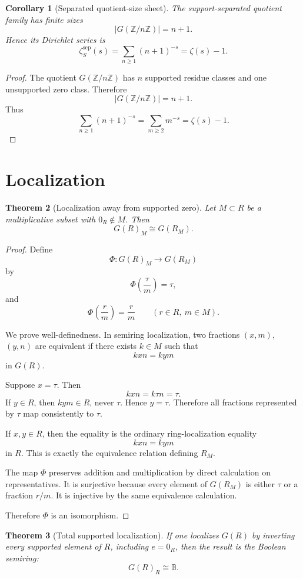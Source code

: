 \documentclass[11pt]{article}
\newtheorem{theorem}{Theorem}[section]
\newtheorem{corollary}[theorem]{Corollary}
\newcommand{\ZZ}{\mathbb Z}
\newcommand{\BB}{\mathbb B}
\begin{document}
\begin{corollary}[Separated quotient-size sheet]
The support-separated quotient family has finite sizes
\[
|G(\ZZ/n\ZZ)|=n+1.
\]
Hence its Dirichlet series is
\[
\zeta_S^{\mathrm{sep}}(s)
=
\sum_{n\ge1}(n+1)^{-s}
=
\zeta(s)-1.
\]
\end{corollary}

\begin{proof}
The quotient \(G(\ZZ/n\ZZ)\) has \(n\) supported residue classes and one unsupported zero class. Therefore
\[
|G(\ZZ/n\ZZ)|=n+1.
\]
Thus
\[
\sum_{n\ge1}(n+1)^{-s}
=
\sum_{m\ge2}m^{-s}
=
\zeta(s)-1.
\]
\end{proof}

\section{Localization}

\begin{theorem}[Localization away from supported zero]
Let \(M\subset R\) be a multiplicative subset with \(0_R\notin M\). Then
\[
G(R)_M\cong G(R_M).
\]
\end{theorem}

\begin{proof}
Define
\[
\Phi:G(R)_M\to G(R_M)
\]
by
\[
\Phi\left(\frac{\tau}{m}\right)=\tau,
\]
and
\[
\Phi\left(\frac{r}{m}\right)=\frac rm
\qquad(r\in R,\ m\in M).
\]

We prove well-definedness. In semiring localization, two fractions \((x,m)\), \((y,n)\) are equivalent if there exists \(k\in M\) such that
\[
kxn=ky m
\]
in \(G(R)\).

Suppose \(x=\tau\). Then
\[
kxn=k\tau n=\tau.
\]
If \(y\in R\), then \(kym\in R\), never \(\tau\). Hence \(y=\tau\). Therefore all fractions represented by \(\tau\) map consistently to \(\tau\).

If \(x,y\in R\), then the equality is the ordinary ring-localization equality
\[
kxn=kym
\]
in \(R\). This is exactly the equivalence relation defining \(R_M\).

The map \(\Phi\) preserves addition and multiplication by direct calculation on representatives. It is surjective because every element of \(G(R_M)\) is either \(\tau\) or a fraction \(r/m\). It is injective by the same equivalence calculation.

Therefore \(\Phi\) is an isomorphism.
\end{proof}

\begin{theorem}[Total supported localization]
If one localizes \(G(R)\) by inverting every supported element of \(R\), including \(e=0_R\), then the result is the Boolean semiring:
\[
G(R)_R\cong\BB.
\]
\end{theorem}
\end{document}
